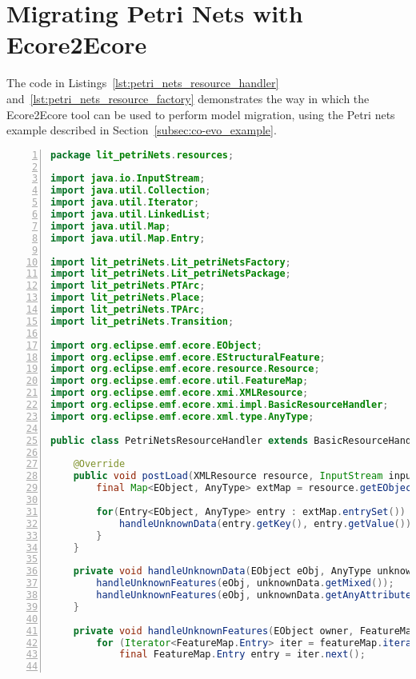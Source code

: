 
\section{Migrating Petri Nets with Ecore2Ecore}
\label{sec:ecore2ecore_listings}
The code in Listings~\ref{lst:petri_nets_resource_handler} and~\ref{lst:petri_nets_resource_factory} demonstrates the way in which the Ecore2Ecore tool \cite{hussey06advanced} can be used to perform model migration, using the Petri nets example described in Section~\ref{subsec:co-evo_example}. 

\begin{lstlisting}[basicstyle=\ttfamily\footnotesize, flexiblecolumns=true, numbers=left, nolol=true, caption=Resource handler for migrating Petri net models., label=lst:petri_nets_resource_handler, language=Java, tabsize=2]
package lit_petriNets.resources;

import java.io.InputStream;
import java.util.Collection;
import java.util.Iterator;
import java.util.LinkedList;
import java.util.Map;
import java.util.Map.Entry;

import lit_petriNets.Lit_petriNetsFactory;
import lit_petriNets.Lit_petriNetsPackage;
import lit_petriNets.PTArc;
import lit_petriNets.Place;
import lit_petriNets.TPArc;
import lit_petriNets.Transition;

import org.eclipse.emf.ecore.EObject;
import org.eclipse.emf.ecore.EStructuralFeature;
import org.eclipse.emf.ecore.resource.Resource;
import org.eclipse.emf.ecore.util.FeatureMap;
import org.eclipse.emf.ecore.xmi.XMLResource;
import org.eclipse.emf.ecore.xmi.impl.BasicResourceHandler;
import org.eclipse.emf.ecore.xml.type.AnyType;

public class PetriNetsResourceHandler extends BasicResourceHandler {

	@Override
	public void postLoad(XMLResource resource, InputStream inputStream, Map<?, ?> options) {
		final Map<EObject, AnyType> extMap = resource.getEObjectToExtensionMap();
		
		for(Entry<EObject, AnyType> entry : extMap.entrySet()) {
			handleUnknownData(entry.getKey(), entry.getValue());
		}
	}

	private void handleUnknownData(EObject eObj, AnyType unknownData) {
		handleUnknownFeatures(eObj, unknownData.getMixed());
		handleUnknownFeatures(eObj, unknownData.getAnyAttribute());
	}

	private void handleUnknownFeatures(EObject owner, FeatureMap featureMap) {
		for (Iterator<FeatureMap.Entry> iter = featureMap.iterator(); iter.hasNext();) {
			final FeatureMap.Entry entry = iter.next();
			

\end{lstlisting}
